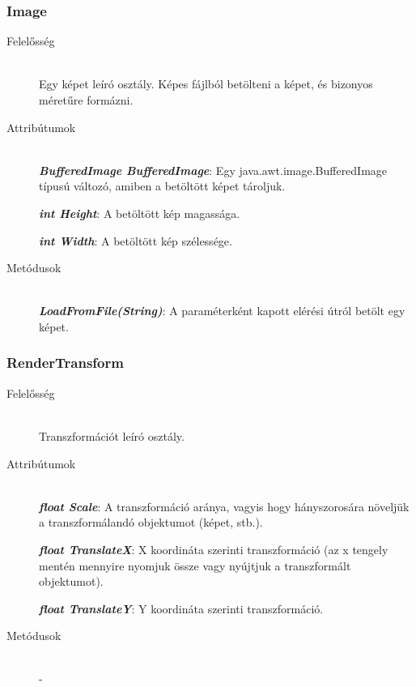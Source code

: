 \subsubsection{Image}
	\begin{description}
		\item[Felelősség] \hfill \\
		Egy képet leíró osztály. Képes fájlból betölteni a képet, és bizonyos méretűre formázni.
		
		\item[Attribútumok]\hfill \\
		
		\textbf{\emph{BufferedImage BufferedImage}}: Egy java.awt.image.BufferedImage típusú változó, amiben a betöltött képet tároljuk.
		
		\textbf{\emph{int Height}}: A betöltött kép magassága.	
		
		\textbf{\emph{int Width}}: A betöltött kép szélessége.	
				
		\item[Metódusok]\hfill \\
		\textbf{\emph{LoadFromFile(String)}}: A paraméterként kapott elérési útról betölt egy képet.

	\end{description}
	
\subsubsection{RenderTransform}
	\begin{description}
		\item[Felelősség] \hfill \\
		Transzformációt leíró osztály.
		
		\item[Attribútumok]\hfill \\
		\textbf{\emph{float Scale}}: A transzformáció aránya, vagyis hogy hányszorosára növeljük a transzformálandó objektumot (képet, stb.).
		
		\textbf{\emph{float TranslateX}}: X koordináta szerinti transzformáció (az x tengely mentén mennyire nyomjuk össze vagy nyújtjuk a transzformált objektumot).	
		
		\textbf{\emph{float TranslateY}}: Y koordináta szerinti transzformáció.	
				
		\item[Metódusok]\hfill \\
		-

	\end{description}

